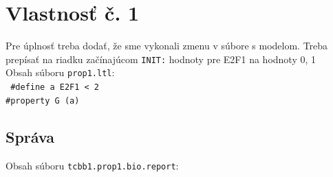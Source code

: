 \documentclass[11pt,final,oneside]{fithesis}
\begin{document}
\chapter{Vlastnos\v t \v c. 1}
\label{sec:caseProp1File}
Pre \'uplnos\v t treba doda\v t, \v ze sme vykonali zmenu v s\'ubore s modelom. Treba prep\'isa\v t na riadku za\v c\'inaj\'ucom 
{\tt INIT:} hodnoty pre {E2F1} na hodnoty 0, 1\\

\noindent
Obsah s\'uboru {\tt prop1.ltl}:\\

{\tt
\noindent
\#define a E2F1 < 2\\

\noindent
\#property G (a)\\
}

\section{Spr\'ava}
\label{sec:prop1report}
Obsah s\'uboru {\tt tcbb1.prop1.bio.report}:\\
\end{document}
